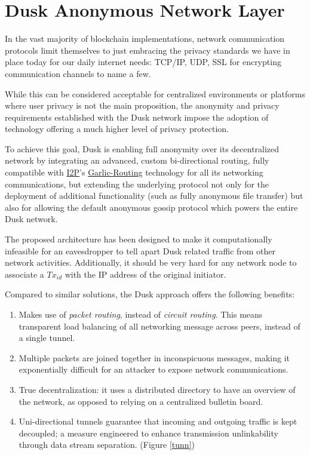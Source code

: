 
\section{\texorpdfstring{Dusk Anonymous Network
Layer}{Dusk Anonymous Network Layer}}


In the vast majority of blockchain implementations, network
communication protocols limit themselves to just embracing the privacy
standards we have in place today for our daily internet needs: TCP/IP,
UDP, SSL for encrypting communication channels to name a few.

While this can be considered acceptable for centralized environments or
platforms where user privacy is not the main proposition, the anonymity
and privacy requirements established with the \textrm{Dusk} network impose the
adoption of technology offering a much higher level of privacy
protection.

To achieve this goal, \textrm{Dusk} is enabling full anonymity over its
decentralized network by integrating an advanced, custom bi-directional
routing, fully compatible with \href{https://geti2p.net/en/}{I2P}'s
\href{https://en.wikipedia.org/wiki/Garlic_routing}{Garlic-Routing}
technology for all its networking communications, but extending the
underlying protocol not only for the deployment of additional
functionality (such as fully anonymous file transfer) but also for
allowing the default anonymous gossip protocol which powers the entire
\textrm{Dusk} network.

The proposed architecture has been designed to make it computationally
infeasible for an eavesdropper to tell apart \textrm{Dusk} related traffic
from other network activities. Additionally, it should be very hard for
any network node to associate a \(Tx_{id}\) with the IP address of the
original initiator.

Compared to similar solutions, the \textrm{Dusk} approach offers the following
benefits:

\begin{enumerate}
\def\labelenumi{\arabic{enumi}.}
\item
  Makes use of \emph{packet routing}, instead of \emph{circuit routing}.
  This means transparent load balancing of all networking message across
  peers, instead of a single tunnel.
\item
  Multiple packets are joined together in inconspicuous messages, making
  it exponentially difficult for an attacker to expose network
  communications.
\item
  True decentralization: it uses a distributed directory to have an
  overview of the network, as opposed to relying on a centralized
  bulletin board.
\item
  Uni-directional tunnels guarantee that incoming and outgoing traffic
  is kept decoupled; a measure engineered to enhance transmission
  unlinkability through data stream separation. (Figure \ref{tunn})
\end{enumerate}

